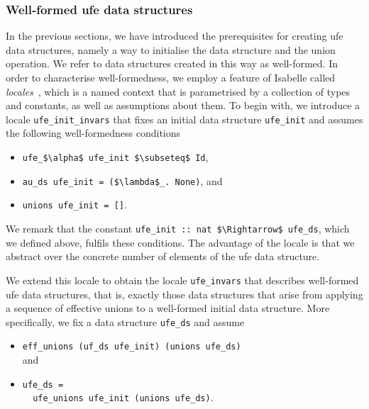 \documentclass[
  sigplan,
  10pt,
  anonymous,
  review,
  ]{acmart}
\newcommand{\opunion}{union}
\begin{document}
\subsubsection{Well-formed \acrshort{ufe} data structures}
In the previous sections, we have introduced the prerequisites for creating \acrshort{ufe} data structures,
namely a way to initialise the data structure and the \opunion{} operation.
We refer to data structures created in this way as well-formed.
In order to characterise well-formedness, we employ a feature of Isabelle called \emph{locales}~\cite{locales}, which is a named context that is parametrised by a collection of types and constants, as well as assumptions about them.
To begin with, we introduce a locale \lstinline|ufe_init_invars| that fixes an initial data structure \lstinline|ufe_init| and assumes the following well-formedness conditions
\begin{itemize}
  \item \lstinline|ufe_$\alpha$ ufe_init $\subseteq$ Id|,
  \item \lstinline|au_ds ufe_init = ($\lambda$_. None)|, and
  \item \lstinline|unions ufe_init = []|.
\end{itemize}
We remark that the constant \lstinline|ufe_init :: nat $\Rightarrow$ ufe_ds|, which we defined above, fulfils these conditions.
The advantage of the locale is that we abstract over the concrete number of elements of the \acrshort{ufe} data structure.

We extend this locale to obtain the locale \lstinline|ufe_invars| that describes well-formed \acrshort{ufe} data structures, that is, exactly those data structures that arise from applying a sequence of effective unions to a well-formed initial data structure.
More specifically, we fix a data structure \lstinline|ufe_ds| and assume
\begin{itemize}
\item \lstinline|eff_unions (uf_ds ufe_init) (unions ufe_ds)|\\and
\item \lstinline|ufe_ds =|\\\lstinline|  ufe_unions ufe_init (unions ufe_ds)|.
\end{itemize}
\end{document}
